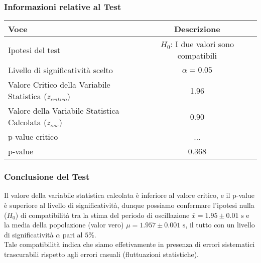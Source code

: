 \documentclass{article}
\begin{document}
\subsubsection{Informazioni relative al Test}

\begin{table}[ht]
    \centering
            \begin{tabular}{|l|c|p{10cm}|}
                \hline
                    \textbf{Voce} & \textbf{Descrizione} \\
                \hline
                    Ipotesi del test & \textbf{\(H_0\)}: I due valori sono compatibili \\
                \hline
                    Livello di significatività scelto & \(\alpha = 0.05\) \\
                \hline
                    Valore Critico della Variabile Statistica ($z_{critico}$)  &  1.96 \\
                \hline
                    Valore della Variabile Statistica Calcolata ($z_{oss}$) & 0.90 \\
                \hline
                p-value critico & ... \\
                \hline
                    p-value & 0.368 \\
                \hline          
            \end{tabular}
        \label{tab:gauss_test}
\end{table}

\subsubsection{Conclusione del Test}
Il valore della variabile statistica calcolata è inferiore al valore critico, e il p-value è superiore al livello di significatività, dunque possiamo confermare l'ipotesi nulla ($H_0$) di compatibilità tra la stima del periodo di oscillazione $\bar{x} = 1.95 \pm 0.01 \text{ s}$ e la media della popolazione (valor vero) $\mu = 1.957 \pm 0.001 \text{ s}$, il tutto con un livello di significatività $\alpha \text{ pari al } 5\%$.
\\Tale compatibilità indica che siamo effetivamente in presenza di errori sistematici trascurabili rispetto agli errori casuali (fluttuazioni statistiche).
\end{document}
